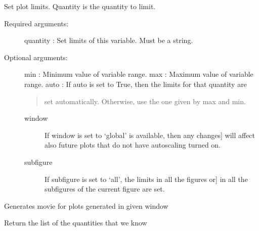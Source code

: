 \documentclass[letterpaper,10pt,english]{sphinxmanual}
\begin{document}
\begin{fulllineitems}
\label{index:facade.limit}
Set plot limits. Quantity is the quantity to limit.
\begin{description}
\item[{Required arguments:}] \leavevmode
quantity   : Set limits of this variable. Must be a string.

\item[{Optional arguments:}] \leavevmode
min        : Minimum value of variable range.
max        : Maximum value of variable range.
auto       : If auto is set to True, then the limits for that quantity are
\begin{quote}

set automatically. Otherwise, use the one given by max and min.
\end{quote}
\begin{description}
\item[{window}] \leavevmode{[}If window is set to `global' is available, then any changes{]}
will affect also future plots that do not have autoscaling
turned on.

\item[{subfigure}] \leavevmode{[}If subfigure is set to `all', the limits in all the figures or{]}
in all the subfigures of the current figure are set.

\end{description}

\end{description}

\end{fulllineitems}


\begin{fulllineitems}
\label{index:facade.make_movie}
Generates movie for plots generated in given window

\end{fulllineitems}


\begin{fulllineitems}
\label{index:facade.KnownQuantities}
Return the list of the quantities that we know

\end{fulllineitems}
\end{document}
